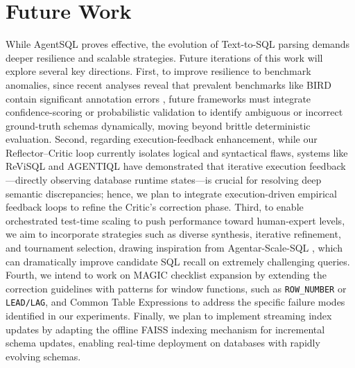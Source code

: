 \section{Future Work}
\label{sec:future_work}

While AgentSQL proves effective, the evolution of Text-to-SQL parsing demands deeper resilience and scalable strategies. Future iterations of this work will explore several key directions. First, to improve resilience to benchmark anomalies, since recent analyses reveal that prevalent benchmarks like BIRD contain significant annotation errors \cite{floratou2024broken}, future frameworks must integrate confidence-scoring or probabilistic validation to identify ambiguous or incorrect ground-truth schemas dynamically, moving beyond brittle deterministic evaluation. Second, regarding execution-feedback enhancement, while our Reflector--Critic loop currently isolates logical and syntactical flaws, systems like ReViSQL \cite{zhu2026revisqlachievinghumanleveltexttosql} and AGENTIQL \cite{heidari_agentiql_2025} have demonstrated that iterative execution feedback---directly observing database runtime states---is crucial for resolving deep semantic discrepancies; hence, we plan to integrate execution-driven empirical feedback loops to refine the Critic's correction phase. Third, to enable orchestrated test-time scaling to push performance toward human-expert levels, we aim to incorporate strategies such as diverse synthesis, iterative refinement, and tournament selection, drawing inspiration from Agentar-Scale-SQL \cite{wang_agentar-scale-sql_2025}, which can dramatically improve candidate SQL recall on extremely challenging queries. Fourth, we intend to work on MAGIC checklist expansion by extending the correction guidelines with patterns for window functions, such as \texttt{ROW\_NUMBER} or \texttt{LEAD/LAG}, and Common Table Expressions to address the specific failure modes identified in our experiments. Finally, we plan to implement streaming index updates by adapting the offline FAISS indexing mechanism for incremental schema updates, enabling real-time deployment on databases with rapidly evolving schemas.
